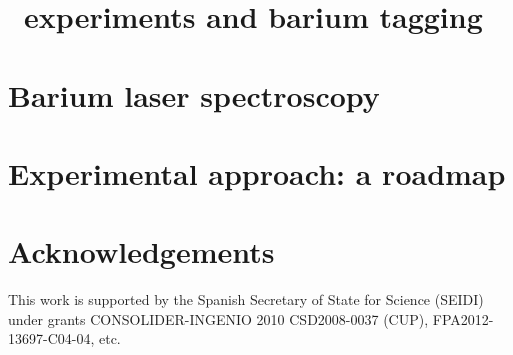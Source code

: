 \documentclass[a4paper,11pt]{report}
\begin{document}


\tableofcontents

\chapter{\bbonu\ experiments and barium tagging}



%
%
\chapter{Barium laser spectroscopy}


%
%
\chapter{Experimental approach: a roadmap} 


\chapter*{Acknowledgements}
This work is supported by the Spanish Secretary of State for Science (SEIDI) under grants CONSOLIDER-INGENIO 2010 CSD2008-0037 (CUP), FPA2012-13697-C04-04, etc.




\end{document}
